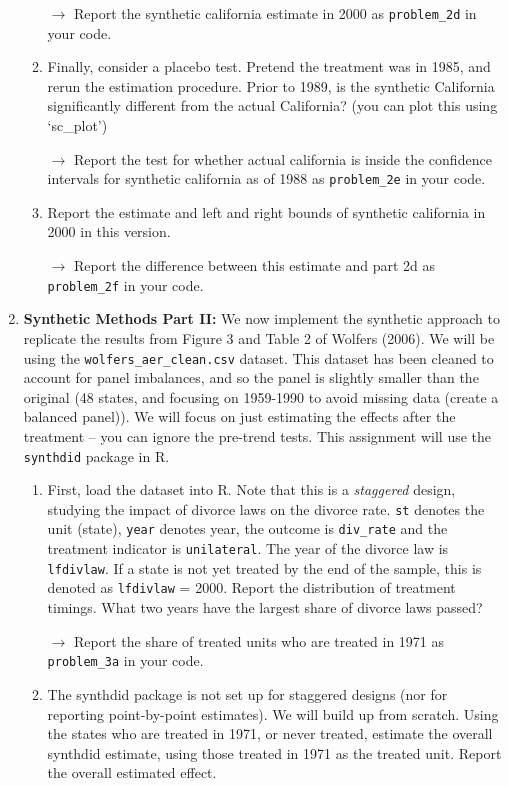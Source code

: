 \documentclass[11pt, a4paper]{article}
\begin{document}
\begin{enumerate}
\begin{enumerate}
    \hspace{10pt} $\rightarrow$ Report the synthetic california estimate in 2000 as   \texttt{problem\_2d} in your code. 
    \item Finally, consider a placebo test. Pretend the treatment was in 1985, and rerun the estimation procedure. Prior to 1989, is the synthetic California significantly different from the actual California?  (you can plot this using `sc\_plot')
    
    \hspace{10pt} $\rightarrow$ Report the test for whether actual california is inside the confidence intervals for synthetic california as of 1988 as \texttt{problem\_2e} in your code. 
    \item Report the estimate and  left and right bounds of synthetic california in 2000 in this version. 
    
    \hspace{10pt} $\rightarrow$ Report the difference between this estimate and part 2d as \texttt{problem\_2f} in your code. 
    \end{enumerate}
    \item \textbf{Synthetic Methods Part II:} We now implement the synthetic approach to replicate the results from Figure 3  and Table 2 of Wolfers (2006). We will be using the \texttt{wolfers\_aer\_clean.csv} dataset. This dataset has been cleaned to account for panel imbalances, and so the panel is slightly smaller than the original (48 states, and focusing on 1959-1990 to avoid missing data (create a balanced panel)). We will focus on just estimating the effects after the treatment -- you can ignore the pre-trend tests. This assignment will use the \texttt{synthdid} package in R.
    \begin{enumerate}
      \item First, load the dataset into R.  Note that this is a \emph{staggered} design, studying the impact of divorce laws on the divorce rate. \texttt{st} denotes the unit (state), \texttt{year} denotes year, the outcome is \texttt{div\_rate} and the treatment indicator is \texttt{unilateral}. The year of the divorce law is \texttt{lfdivlaw}. If a state is not yet treated by the end of the sample, this is denoted as \texttt{lfdivlaw} = 2000. Report the distribution of treatment timings. What two years have the largest share of divorce laws passed?

      \hspace{10pt} $\rightarrow$ Report the share of treated units who are treated in 1971 as \texttt{problem\_3a} in your code. 
      \item The synthdid package is not set up for staggered designs (nor for reporting point-by-point estimates). We will build up from scratch. 
      Using the states who are treated in 1971, or never treated, estimate the overall synthdid estimate, using those treated in 1971 as the treated unit. Report the overall estimated effect.


\end{enumerate}
\end{enumerate}
\end{document}
